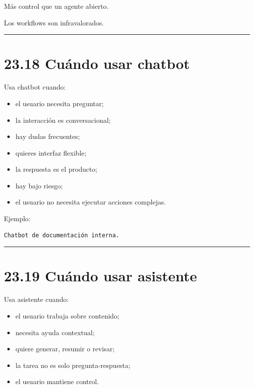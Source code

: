 Más control que un agente abierto.

Los workflows son infravalorados.

\begin{center}\rule{0.5\linewidth}{0.5pt}\end{center}

\section{23.18 Cuándo usar chatbot}\label{cuuxe1ndo-usar-chatbot}

Usa chatbot cuando:

\begin{itemize}
\tightlist
\item
  el usuario necesita preguntar;
\item
  la interacción es conversacional;
\item
  hay dudas frecuentes;
\item
  quieres interfaz flexible;
\item
  la respuesta es el producto;
\item
  hay bajo riesgo;
\item
  el usuario no necesita ejecutar acciones complejas.
\end{itemize}

Ejemplo:

\begin{lstlisting}
Chatbot de documentación interna.
\end{lstlisting}

\begin{center}\rule{0.5\linewidth}{0.5pt}\end{center}

\section{23.19 Cuándo usar asistente}\label{cuuxe1ndo-usar-asistente}

Usa asistente cuando:

\begin{itemize}
\tightlist
\item
  el usuario trabaja sobre contenido;
\item
  necesita ayuda contextual;
\item
  quiere generar, resumir o revisar;
\item
  la tarea no es solo pregunta-respuesta;
\item
  el usuario mantiene control.
\end{itemize}

